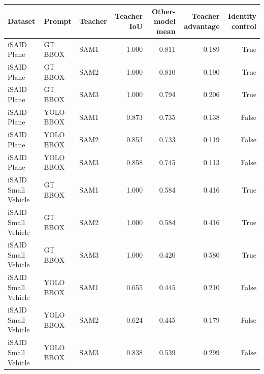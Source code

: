 \begin{tabular}{lllrrrr}
\toprule
Dataset & Prompt & Teacher & Teacher IoU & Other-model mean & Teacher advantage & Identity control \\
\midrule
iSAID Plane & GT BBOX & SAM1 & 1.000 & 0.811 & 0.189 & True \\
iSAID Plane & GT BBOX & SAM2 & 1.000 & 0.810 & 0.190 & True \\
iSAID Plane & GT BBOX & SAM3 & 1.000 & 0.794 & 0.206 & True \\
iSAID Plane & YOLO BBOX & SAM1 & 0.873 & 0.735 & 0.138 & False \\
iSAID Plane & YOLO BBOX & SAM2 & 0.853 & 0.733 & 0.119 & False \\
iSAID Plane & YOLO BBOX & SAM3 & 0.858 & 0.745 & 0.113 & False \\
iSAID Small Vehicle & GT BBOX & SAM1 & 1.000 & 0.584 & 0.416 & True \\
iSAID Small Vehicle & GT BBOX & SAM2 & 1.000 & 0.584 & 0.416 & True \\
iSAID Small Vehicle & GT BBOX & SAM3 & 1.000 & 0.420 & 0.580 & True \\
iSAID Small Vehicle & YOLO BBOX & SAM1 & 0.655 & 0.445 & 0.210 & False \\
iSAID Small Vehicle & YOLO BBOX & SAM2 & 0.624 & 0.445 & 0.179 & False \\
iSAID Small Vehicle & YOLO BBOX & SAM3 & 0.838 & 0.539 & 0.299 & False \\
\bottomrule
\end{tabular}
